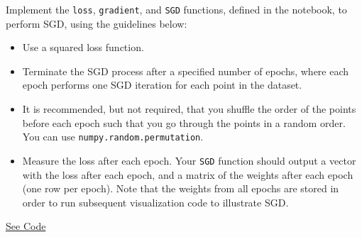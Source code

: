 \documentclass{article}
\begin{document}
\begin{problem}[8]
  Implement the \texttt{loss}, \texttt{gradient}, and \texttt{SGD} functions, defined in the notebook, to perform SGD, using the guidelines below:

  \begin{itemize}
    \item Use a squared loss function.
    \item Terminate the SGD process after a specified number of epochs, where each epoch performs one SGD iteration for each point in the dataset.
    \item It is recommended, but not required, that you shuffle the order of the points before each epoch such that you go through the points in a random order. You can use \texttt{numpy.random.permutation}.
    \item Measure the loss after each epoch. Your \texttt{SGD} function should output a vector with the loss after each epoch, and a matrix of the weights after each epoch (one row per epoch). Note that the weights from all epochs are stored in order to run subsequent visualization code to illustrate SGD.
  \end{itemize}
\end{problem}
\begin{solution}
\href{https://drive.google.com/file/d/1dmn0Wqlo5ujOcG65CakWRdpJMhL18FGV/view?usp=sharing}{See Code} %
\end{solution}
\end{document}
